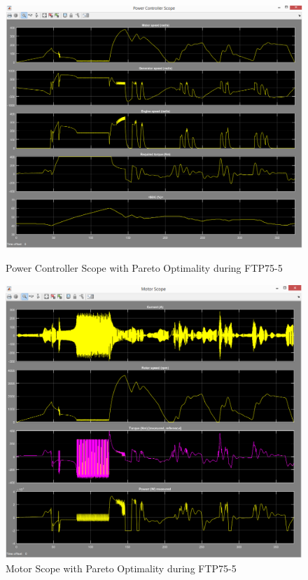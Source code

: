 \begin{figure}[hp]
\centering
\includegraphics[scale=0.4]{figures/Pareto/FTP75-5/powerController05Juli}
\caption{Power Controller Scope with Pareto Optimality during FTP75-5}
\label{fig:pcpo5}
\includegraphics[scale=0.37]{figures/Pareto/FTP75-5/motor05Juli}
\caption{Motor Scope with Pareto Optimality during FTP75-5}
\label{fig:mpo5}
\end{figure}

